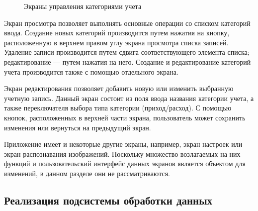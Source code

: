 \begin{figure}[h!]
  \centering
  \caption{Экраны управления категориями учета}
  \label{fig:implementation_ui_activity_category}
\end{figure}

Экран просмотра позволяет выполнять основные операции
со списком категорий ввода.
Создание новых категорий производится путем нажатия на кнопку,
расположенную в верхнем правом углу экрана просмотра списка записей.
Удаление записи производится путем сдвига соответствующего элемента списка;
редактирование --- путем нажатия на него.
Создание и редактирование категорий учета производится также
с помощью отдельного экрана.

Экран редактирования позволяет добавить новую или изменить выбранную
учетную запись. Данный экран состоит из поля ввода названия категории учета,
а также переключателя выбора типа категории (приход/расход).
С помощью кнопок, расположенных в верхней части экрана, пользователь
может сохранить изменения или вернуться на предыдущий экран.

Приложение имеет и некоторые другие экраны, например,
экран настроек или экран распознавания изображений.
Поскольку множество возлагаемых на них функций
и пользовательский интерфейс данных экранов является объектом для
изменений, в данном разделе они не рассматриваются.


\subsection{Реализация подсистемы обработки данных}
\label{subsec:implementation_bl}

